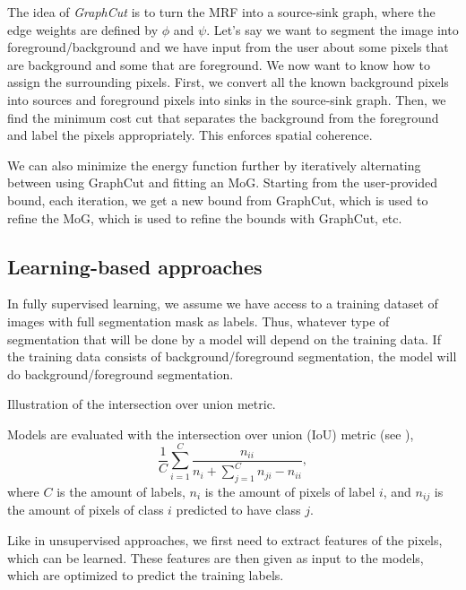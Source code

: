 The idea of \textit{GraphCut} is to turn the MRF into a source-sink graph,
where the edge weights are defined by $\phi$ and $\psi$. Let's say we want to
segment the image into foreground/background and we have input
from the user about some pixels that are background and some that are
foreground. We now want to know how to assign the surrounding pixels. First, we
convert all the known background pixels into sources and foreground pixels into
sinks in the source-sink graph. Then, we find the minimum cost cut that
separates the background from the foreground and label the pixels
appropriately. This enforces spatial coherence.

We can also minimize the energy function further by iteratively alternating
between using GraphCut and fitting an MoG. Starting from the user-provided
bound, each iteration, we get a new bound from GraphCut, which is used to
refine the MoG, which is used to refine the bounds with GraphCut, etc.

\subsection{Learning-based approaches}

In fully supervised learning, we assume we have access to a training dataset
of images with full segmentation mask as labels. Thus, whatever type of
segmentation that will be done by a model will depend on the training data.
If the training data consists of background/foreground segmentation, the
model will do background/foreground segmentation.

\begin{marginfigure}
    \centering
    \caption{Illustration of the intersection over union metric.}
    \label{fig:intersection-over-union-metric}
\end{marginfigure}

Models are evaluated with the intersection over union (IoU) metric (see
), \[
    \frac{1}{C} \sum_{i=1}^C \frac{n_{ii}}{n_i + \sum_{j=1}^C n_{ji} - n_{ii}},
\]
where $C$ is the amount of labels, $n_i$ is the amount of pixels of label
$i$, and $n_{ij}$ is the amount of pixels of class $i$ predicted to have
class $j$.

Like in unsupervised approaches, we first need to extract features of the
pixels, which can be learned. These features are then given as input to the
models, which are optimized to predict the training labels.

